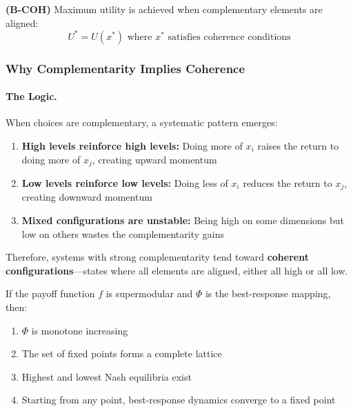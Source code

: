 \begin{axiom}
\label{ax:B-coherence}
\textbf{(B-COH)} Maximum utility is achieved when complementary elements 
are aligned:
\begin{equation}
    U^* = U(x^*) \text{ where } x^* \text{ satisfies coherence conditions}
\end{equation}
\end{axiom}

\subsubsection{Why Complementarity Implies Coherence}

\paragraph{The Logic.}
When choices are complementary, a systematic pattern emerges:
\begin{enumerate}
    \item \textbf{High levels reinforce high levels:} Doing more of $x_i$ raises
          the return to doing more of $x_j$, creating upward momentum
    \item \textbf{Low levels reinforce low levels:} Doing less of $x_i$ reduces
          the return to $x_j$, creating downward momentum
    \item \textbf{Mixed configurations are unstable:} Being high on some dimensions
          but low on others wastes the complementarity gains
\end{enumerate}

Therefore, systems with strong complementarity tend toward \textbf{coherent
configurations}---states where all elements are aligned, either all high or all low.

\begin{proposition}
\label{prop:coherence-from-complementarity}
If the payoff function $f$ is supermodular and $\Phi$ is the best-response mapping,
then:
\begin{enumerate}
    \item $\Phi$ is monotone increasing
    \item The set of fixed points forms a complete lattice
    \item Highest and lowest Nash equilibria exist
    \item Starting from any point, best-response dynamics converge to a fixed point
\end{enumerate}
\end{proposition}

